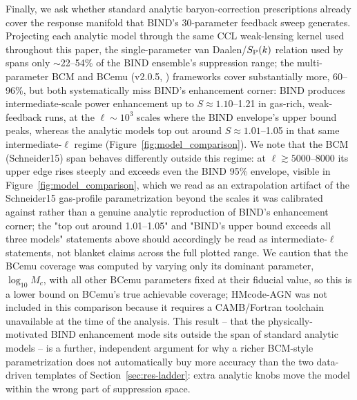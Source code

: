 \documentclass[11pt]{article}
\begin{document}
Finally, we ask whether standard analytic baryon-correction prescriptions
already cover the response manifold that BIND's 30-parameter feedback sweep
generates. Projecting each analytic model through the same CCL weak-lensing
kernel used throughout this paper, the single-parameter van Daalen/$S_{\rm P}(k)$
relation used by \citet{vanDaalen2020} spans only $\sim$22--54\% of the BIND
ensemble's suppression range; the multi-parameter BCM
\citep{schneiderTeyssier2015} and BCemu (v2.0.5, \citealt{giriSchneider2021})
frameworks cover substantially more, 60--96\%, but both systematically miss
BIND's enhancement corner: BIND produces intermediate-scale power
enhancement up to $S\approx1.10$--1.21 in gas-rich, weak-feedback runs, at
the $\ell\sim10^3$ scales where the BIND envelope's upper bound peaks,
whereas the analytic models top out around $S\approx1.01$--1.05 in that same
intermediate-$\ell$ regime (Figure~\ref{fig:model_comparison}). We note that
the BCM (Schneider15) span behaves differently outside this regime: at
$\ell\gtrsim5000$--8000 its upper edge rises steeply and exceeds even the
BIND 95\% envelope, visible in Figure~\ref{fig:model_comparison}, which we
read as an extrapolation artifact of the Schneider15 gas-profile
parametrization beyond the scales it was calibrated against rather than a
genuine analytic reproduction of BIND's enhancement corner; the "top out
around 1.01--1.05" and "BIND's upper bound exceeds all three models"
statements above should accordingly be read as intermediate-$\ell$
statements, not blanket claims across the full plotted range. %
We caution that the BCemu coverage was computed by varying only its
dominant parameter, $\log_{10}M_c$, with all other BCemu parameters fixed at
their fiducial value, so this is a lower bound on BCemu's true achievable
coverage; HMcode-AGN \citep{mead2015,mead2021} was not included in this
comparison because it requires a CAMB/Fortran toolchain unavailable at the
time of the analysis. This result -- that the physically-motivated BIND
enhancement mode sits outside the span of standard analytic models -- is a
further, independent argument for why a richer BCM-style parametrization
does not automatically buy more accuracy than the two data-driven templates
of Section~\ref{sec:res-ladder}: extra analytic knobs move the model within
the wrong part of suppression space.
\end{document}
